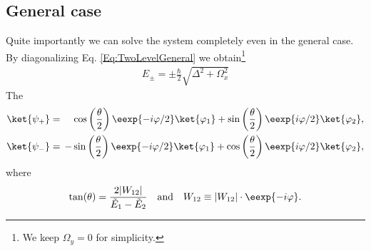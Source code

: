 \subsection{General case}

Quite importantly we can solve the system completely even in the general case. By diagonalizing  Eq. \eqref{Eq:TwoLevelGeneral} we obtain\footnote{We keep $\Omega_y =0$ for simplicity.}
\begin{align}\label{eq:Epm}
 E_\pm = \pm \frac{\hbar}{2} \sqrt{\Delta^2+\Omega_x^2}
\end{align}
The 
\begin{align}
				\ket{\psi_+}&=&\hspace{-2mm}&\cos\left(\frac{\theta}{2}\right) \eexp{-i{\varphi}/{2}}\ket{\varphi_1}+\sin\left(\frac{\theta}{2}\right) \eexp{i{\varphi}/{2}}\ket{\varphi_2}, \label{eq:staticpsiplus} \\ 
				\ket{\psi_-}&=&\hspace{-2mm}-&\sin\left(\frac{\theta}{2}\right) \eexp{-i{\varphi}/{2}}\ket{\varphi_1}+\cos\left(\frac{\theta}{2}\right) \eexp{i{\varphi}/{2}}\ket{\varphi_2}, \label{eq:staticpsiminus}
			\end{align}
			where 
			\begin{align} \label{eq:parameters}
				\tan(\theta) = \frac{2|W_{12}|}{\tilde{E}_1-\tilde{E}_2} \quad \text{and} \quad W_{12} \equiv |W_{12}|\cdot \eexp{-i\varphi}.
			\end{align}